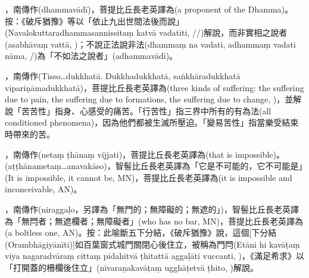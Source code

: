 \startitemgroup[noteitems]
\item{}，南傳作(dhammavādī)，菩提比丘長老英譯為(a proponent of the Dhamma)。按：《破斥猶豫》等以「依止九出世間法後而說」(Navalokuttaradhammasannissitaṃ katvā vadatīti, //)解說，而非實相之說者(asabhāvaṃ vattā, )；不說正法說非法(dhammaṃ na vadati, adhammaṃ vadati nāma, /)為「不如法之說者」(adhammavādī)。
\stopitemgroup

\startitemgroup[noteitems]
\item{}，南傳作(Tisso…dukkhatā. Dukkhadukkhatā, saṅkhāradukkhatā vipariṇāmadukkhatā)，菩提比丘長老英譯為(three kinds of suffering: the suffering due to pain, the suffering due to formations, the suffering due to change, )，並解說「苦苦性」指身、心感受的痛苦。「行苦性」指三界中所有的有為法(all conditioned phenomena)，因為他們都被生滅所壓迫。「變易苦性」指當樂受結束時帶來的苦。
\stopitemgroup

\startitemgroup[noteitems]
\item{}，南傳作(netaṃ ṭhānaṃ vijjati)，菩提比丘長老英譯為(that is impossible)。(aṭṭhānametaṃ…anavakāso)，智髻比丘長老英譯為「它是不可能的，它不可能是」(It is impossible, it cannot be, MN)，菩提比丘長老英譯為(it is impossible and inconceivable, AN)。
\stopitemgroup

\startitemgroup[noteitems]
\item{}，南傳作(niraggaḷo，另譯為「無門的；無障礙的；無遮的」)，智髻比丘長老英譯為「無閂者；無遮欄者；無障礙者」(who has no bar, MN)，菩提比丘長老英譯為(a boltless one, AN)。按：此喻斷五下分結，《破斥猶豫》說，這個[下分結(Orambhāgiyānīti)]如百葉窗式城門關閉心後住立，被稱為門閂(Etāni hi kavāṭaṃ viya nagaradvāraṃ cittaṃ pidahitvā ṭhitattā aggaḷāti vuccanti, )，《滿足希求》以「打開蓋的柵欄後住立」(nīvaraṇakavāṭaṃ ugghāṭetvā ṭhito, )解說。
\stopitemgroup

